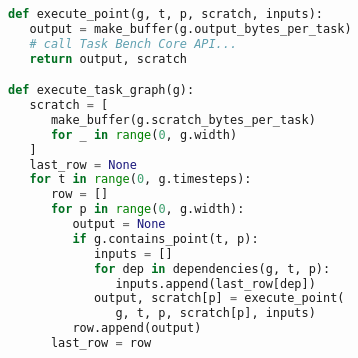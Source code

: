 \begin{lstlisting}[language=Python,caption={Excerpt from Task Bench implementation in Dask.\label{lst:code-sample}},float]
def execute_point(g, t, p, scratch, inputs):
   output = make_buffer(g.output_bytes_per_task)
   # call Task Bench Core API...
   return output, scratch

def execute_task_graph(g):
   scratch = [
      make_buffer(g.scratch_bytes_per_task)
      for _ in range(0, g.width)
   ]
   last_row = None
   for t in range(0, g.timesteps):
      row = []
      for p in range(0, g.width):
         output = None
         if g.contains_point(t, p):
            inputs = []
            for dep in dependencies(g, t, p):
               inputs.append(last_row[dep])
            output, scratch[p] = execute_point(
               g, t, p, scratch[p], inputs)
         row.append(output)
      last_row = row
\end{lstlisting}
